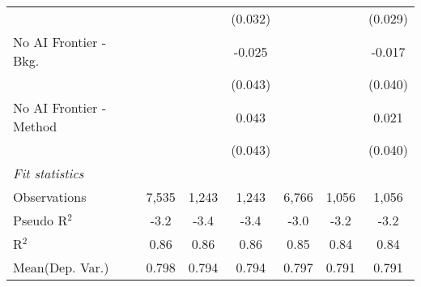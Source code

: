 \begin{tabular}{lcccccc}
                           &         &             & (0.032)     &         &              & (0.029)\\   
   No AI Frontier - Bkg.   &         &             & -0.025      &         &              & -0.017\\   
                           &         &             & (0.043)     &         &              & (0.040)\\   
   No AI Frontier - Method &         &             & 0.043       &         &              & 0.021\\   
                           &         &             & (0.043)     &         &              & (0.040)\\   
   \midrule
   \emph{Fit statistics}\\
   Observations            & 7,535   & 1,243       & 1,243       & 6,766   & 1,056        & 1,056\\  
   Pseudo R$^2$            & -3.2    & -3.4        & -3.4        & -3.0    & -3.2         & -3.2\\  
   R$^2$                   & 0.86    & 0.86        & 0.86        & 0.85    & 0.84         & 0.84\\  
Mean(Dep. Var.) & 0.798 & 0.794 & 0.794 & 0.797 & 0.791 & 0.791 \\
   

\end{tabular}
